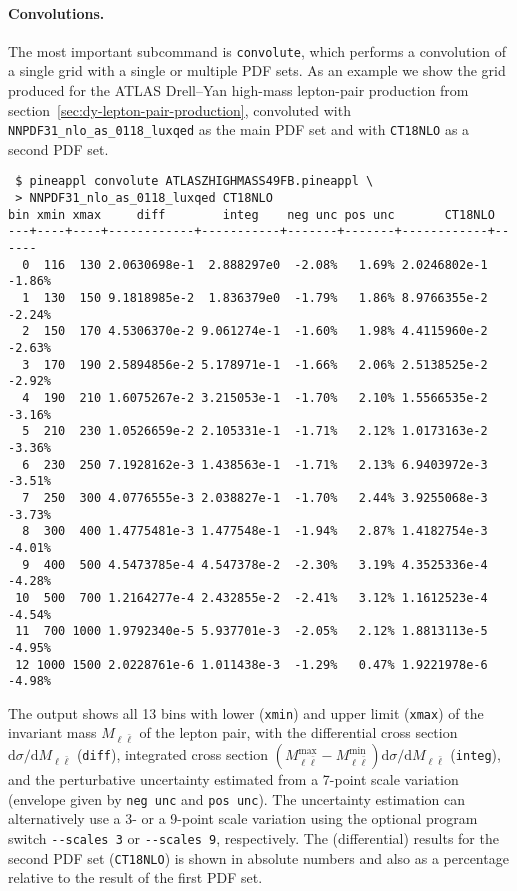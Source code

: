 \paragraph{Convolutions.}
The most important subcommand is \texttt{convolute}, which performs a convolution of a single grid with a single or multiple PDF sets.
As an example we show the grid produced for the ATLAS Drell--Yan high-mass lepton-pair production from section~\ref{sec:dy-lepton-pair-production}, convoluted with \texttt{NNPDF31\_nlo\_as\_0118\_luxqed} as the main PDF set and with \texttt{CT18NLO} as a second PDF set.
\begin{verbatim}
 $ pineappl convolute ATLASZHIGHMASS49FB.pineappl \
 > NNPDF31_nlo_as_0118_luxqed CT18NLO
bin xmin xmax     diff        integ    neg unc pos unc       CT18NLO
---+----+----+------------+-----------+-------+-------+------------+------
  0  116  130 2.0630698e-1  2.888297e0  -2.08%   1.69% 2.0246802e-1 -1.86%
  1  130  150 9.1818985e-2  1.836379e0  -1.79%   1.86% 8.9766355e-2 -2.24%
  2  150  170 4.5306370e-2 9.061274e-1  -1.60%   1.98% 4.4115960e-2 -2.63%
  3  170  190 2.5894856e-2 5.178971e-1  -1.66%   2.06% 2.5138525e-2 -2.92%
  4  190  210 1.6075267e-2 3.215053e-1  -1.70%   2.10% 1.5566535e-2 -3.16%
  5  210  230 1.0526659e-2 2.105331e-1  -1.71%   2.12% 1.0173163e-2 -3.36%
  6  230  250 7.1928162e-3 1.438563e-1  -1.71%   2.13% 6.9403972e-3 -3.51%
  7  250  300 4.0776555e-3 2.038827e-1  -1.70%   2.44% 3.9255068e-3 -3.73%
  8  300  400 1.4775481e-3 1.477548e-1  -1.94%   2.87% 1.4182754e-3 -4.01%
  9  400  500 4.5473785e-4 4.547378e-2  -2.30%   3.19% 4.3525336e-4 -4.28%
 10  500  700 1.2164277e-4 2.432855e-2  -2.41%   3.12% 1.1612523e-4 -4.54%
 11  700 1000 1.9792340e-5 5.937701e-3  -2.05%   2.12% 1.8813113e-5 -4.95%
 12 1000 1500 2.0228761e-6 1.011438e-3  -1.29%   0.47% 1.9221978e-6 -4.98%
\end{verbatim}
The output shows all 13 bins with lower (\texttt{xmin}) and upper limit (\texttt{xmax}) of the invariant mass $M_{\ell \bar{\ell}}$ of the lepton pair, with the differential cross section $\mathrm{d} \sigma / \mathrm{d} M_{\ell \bar{\ell}}$ (\texttt{diff}), integrated cross section $(M_{\ell \bar{\ell}}^\mathrm{max} - M_{\ell \bar{\ell}}^\mathrm{min}) \mathrm{d} \sigma / \mathrm{d} M_{\ell \bar{\ell}}$ (\texttt{integ}), and the perturbative uncertainty estimated from a 7-point scale variation (envelope given by \texttt{neg unc} and \texttt{pos unc}).
The uncertainty estimation can alternatively use a 3- or a 9-point scale variation using the optional program switch \texttt{-{}-scales 3} or \texttt{-{}-scales 9}, respectively.
The (differential) results for the second PDF set (\texttt{CT18NLO}) is shown in absolute numbers and also as a percentage relative to the result of the first PDF set.

